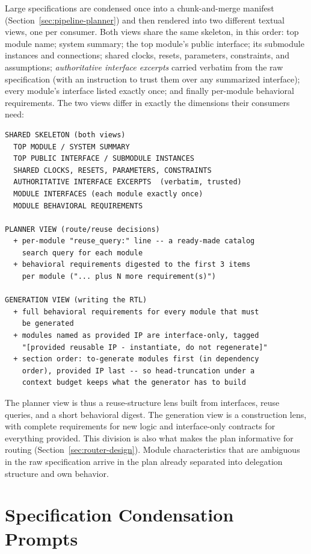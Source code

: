 Large specifications are condensed once into a chunk-and-merge manifest
(Section~\ref{sec:pipeline-planner}) and then rendered into two
different textual views, one per consumer. Both views share the same
skeleton, in this order: top module name; system summary; the top
module's public interface; its submodule instances and connections;
shared clocks, resets, parameters, constraints, and assumptions;
\emph{authoritative interface excerpts} carried verbatim from the raw
specification (with an instruction to trust them over any summarized
interface); every module's interface listed exactly once; and finally
per-module behavioral requirements. The two views differ in exactly the
dimensions their consumers need:

\begin{lstlisting}[language={},caption={Planner view vs.\ generation view:
the rendered differences.},label={lst:views}]
SHARED SKELETON (both views)
  TOP MODULE / SYSTEM SUMMARY
  TOP PUBLIC INTERFACE / SUBMODULE INSTANCES
  SHARED CLOCKS, RESETS, PARAMETERS, CONSTRAINTS
  AUTHORITATIVE INTERFACE EXCERPTS  (verbatim, trusted)
  MODULE INTERFACES (each module exactly once)
  MODULE BEHAVIORAL REQUIREMENTS

PLANNER VIEW (route/reuse decisions)
  + per-module "reuse_query:" line -- a ready-made catalog
    search query for each module
  + behavioral requirements digested to the first 3 items
    per module ("... plus N more requirement(s)")

GENERATION VIEW (writing the RTL)
  + full behavioral requirements for every module that must
    be generated
  + modules named as provided IP are interface-only, tagged
    "[provided reusable IP - instantiate, do not regenerate]"
  + section order: to-generate modules first (in dependency
    order), provided IP last -- so head-truncation under a
    context budget keeps what the generator has to build
\end{lstlisting}

The planner view is thus a reuse-structure lens built from interfaces,
reuse queries, and a short behavioral digest. The generation view is
a construction lens, with complete requirements for new logic and
interface-only contracts for everything provided. This division is also
what makes the plan informative for routing
(Section~\ref{sec:router-design}). Module characteristics that are
ambiguous in the raw specification arrive in the plan already separated
into delegation structure and own behavior.

\section{Specification Condensation Prompts}
\label{app:condense}

